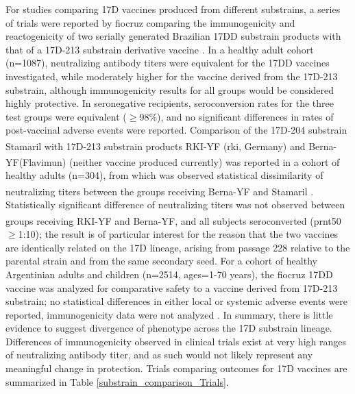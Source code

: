 For studies comparing 17D vaccines produced from different substrains, a series of trials were reported by \gls{fiocruz} comparing the immunogenicity and reactogenicity of two serially generated Brazilian 17DD substrain products with that of a 17D-213 substrain derivative vaccine \parencite{Camacho:2004ui,Camacho:2005vb}.  In a healthy adult cohort (n=1087), neutralizing antibody titers were equivalent for the 17DD vaccines investigated, while moderately higher for the vaccine derived from the 17D-213 substrain, although immunogenicity results for all groups would be considered highly protective. In seronegative recipients, seroconversion rates for the three test groups were equivalent ($\geq$98\%), and no significant differences in rates of post-vaccinal adverse events were reported. Comparison of the 17D-204 substrain Stamaril\textsuperscript{\textregistered} with 17D-213 substrain products RKI-YF\textsuperscript{\textregistered} (\gls{rki}, Germany) and Berna-YF(Flavimun\textsuperscript{\textregistered}) (neither vaccine produced currently) was reported in a cohort of healthy adults (n=304), from which was observed statistical dissimilarity of neutralizing titers between the groups receiving Berna-YF\textsuperscript{\textregistered} and Stamaril\textsuperscript{\textregistered} \parencite{Pfister:2005tm}. Statistically significant difference of neutralizing titers was not observed between groups receiving RKI-YF\textsuperscript{\textregistered} and Berna-YF\textsuperscript{\textregistered}, and all subjects seroconverted (\gls{prnt50}$\geq$1:10); the result is of particular interest for the reason that the two vaccines are identically related on the 17D lineage, arising from passage 228 relative to the parental strain and from the same secondary seed. For a cohort of healthy Argentinian adults and children (n=2514, ages=1-70 years), the \gls{fiocruz} 17DD vaccine was analyzed for comparative safety to a vaccine derived from 17D-213 substrain; no statistical differences in either local or systemic adverse events were reported, immunogenicity data were not analyzed \parencite{Ripoll:2014fz}. In summary, there is little evidence to suggest divergence of phenotype across the 17D substrain lineage. Differences of immunogenicity observed in clinical trials exist at very high ranges of neutralizing antibody titer, and as such would not likely represent any meaningful change in protection. Trials comparing outcomes for 17D vaccines are summarized in Table \ref{substrain_comparison_Trials}.


